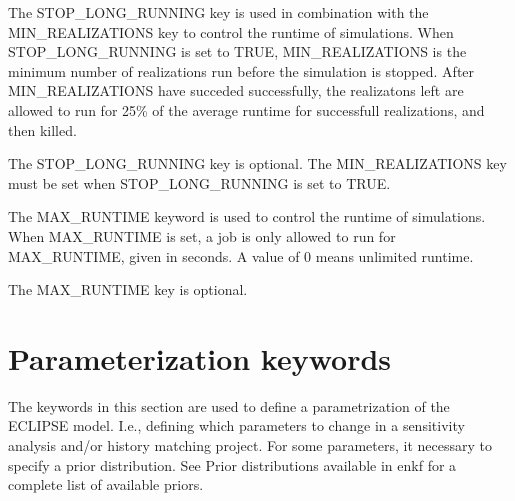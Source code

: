 \documentclass[a4paper,10pt,english]{sphinxmanual}
\begin{document}
\begin{sphinxShadowBox}

The STOP\_LONG\_RUNNING key is used in combination with the MIN\_REALIZATIONS key
to control the runtime of simulations. When STOP\_LONG\_RUNNING is set to TRUE,
MIN\_REALIZATIONS is the minimum number of realizations run before the
simulation is stopped. After MIN\_REALIZATIONS have succeded successfully, the
realizatons left are allowed to run for 25\% of the average runtime for
successfull realizations, and then killed.


%
\begin{sphinxVerbatim}[commandchars=\\\{\}]
         
  
 
\end{sphinxVerbatim}

The STOP\_LONG\_RUNNING key is optional. The MIN\_REALIZATIONS key must be set
when STOP\_LONG\_RUNNING is set to TRUE.
\end{sphinxShadowBox}
\label{\detokenize{keywords/index:max-runtime}}
\begin{sphinxShadowBox}

The MAX\_RUNTIME keyword is used to control the runtime of simulations. When
MAX\_RUNTIME is set, a job is only allowed to run for MAX\_RUNTIME, given in
seconds. A value of 0 means unlimited runtime.


%
\begin{sphinxVerbatim}[commandchars=\\\{\}]
       
 
\end{sphinxVerbatim}

The MAX\_RUNTIME key is optional.
\end{sphinxShadowBox}


\section{Parameterization keywords}
\label{\detokenize{keywords/index:parameterization-keywords}}\label{\detokenize{keywords/index:id4}}
The keywords in this section are used to define a parametrization of the ECLIPSE
model. I.e., defining which parameters to change in a sensitivity analysis
and/or history matching project. For some parameters, it necessary to specify a
prior distribution. See Prior distributions available in enkf for a complete
list of available priors.
\end{document}
